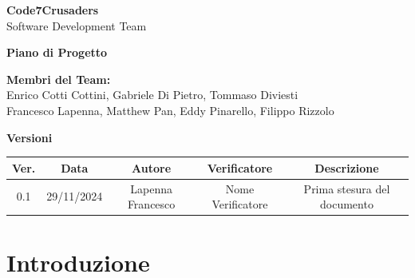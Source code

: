 \documentclass{article}
\begin{document}
\begin{titlepage}
    {\Huge \textbf{Code7Crusaders}}\\
    \vspace{0.5cm}
    {\Large Software Development Team}\\
    \vspace{2cm}
    
    {\large \textbf{Piano di Progetto}}\\
    \vspace{5cm}
    
    
    \textbf{Membri del Team:}\\
    Enrico Cotti Cottini, Gabriele Di Pietro, Tommaso Diviesti \\
    Francesco Lapenna, Matthew Pan, Eddy Pinarello, Filippo Rizzolo \\
    \vspace{0.5cm}
    
    \vspace{1cm}
\end{titlepage}



\newpage
\begin{table}[h!]
\centering
\textbf{Versioni} \\ %
\vspace{2mm} %
\begin{tabular}{|c|c|c|c|c|}
    \hline
    \textbf{Ver.} & \textbf{Data} & \textbf{Autore} & \textbf{Verificatore} & \textbf{Descrizione} \\
    \hline
    0.1 & 29/11/2024 & Lapenna Francesco & Nome Verificatore & Prima stesura del documento \\ 
    \hline
\end{tabular}
\end{table}



\newpage
\tableofcontents



\newpage
\section{Introduzione}
\end{document}
